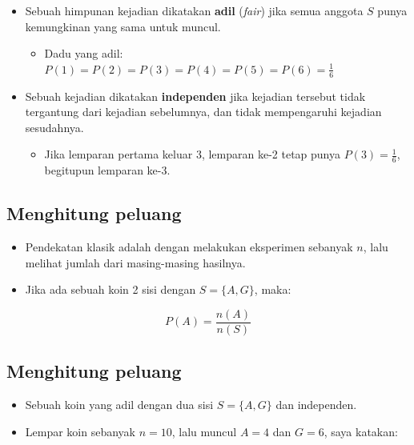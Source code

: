 \documentclass[
  letterpaper,
  DIV=11,
  numbers=noendperiod]{scrartcl}
\providecommand{\tightlist}{%
  \setlength{\itemsep}{0pt}\setlength{\parskip}{0pt}}\usepackage{longtable,booktabs,array}
\begin{document}
\begin{itemize}
\item
  Sebuah himpunan kejadian dikatakan \textbf{adil} (\emph{fair}) jika
  semua anggota \(S\) punya kemungkinan yang sama untuk muncul.

  \begin{itemize}
  \tightlist
  \item
    Dadu yang adil: \(P(1)=P(2)=P(3)=P(4)=P(5)=P(6)=\frac{1}{6}\)
  \end{itemize}
\item
  Sebuah kejadian dikatakan \textbf{independen} jika kejadian tersebut
  tidak tergantung dari kejadian sebelumnya, dan tidak mempengaruhi
  kejadian sesudahnya.

  \begin{itemize}
  \tightlist
  \item
    Jika lemparan pertama keluar 3, lemparan ke-2 tetap punya
    \(P(3)=\frac{1}{6}\), begitupun lemparan ke-3.
  \end{itemize}
\end{itemize}

\hypertarget{menghitung-peluang}{%
\subsection{Menghitung peluang}\label{menghitung-peluang}}

\begin{itemize}
\item
  Pendekatan klasik adalah dengan melakukan eksperimen sebanyak \(n\),
  lalu melihat jumlah dari masing-masing hasilnya.
\item
  Jika ada sebuah koin 2 sisi dengan \(S=\{A,G\}\), maka:
\end{itemize}

\[
P(A)=\frac{n(A)}{n(S)}
\]

\hypertarget{menghitung-peluang-1}{%
\subsection{Menghitung peluang}\label{menghitung-peluang-1}}

\begin{itemize}
\item
  Sebuah koin yang adil dengan dua sisi \(S=\{A,G\}\) dan independen.
\item
  Lempar koin sebanyak \(n=10\), lalu muncul \(A=4\) dan \(G=6\), saya
  katakan:
\end{itemize}
\end{document}
